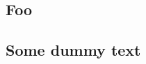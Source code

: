 \documentclass{report}
\begin{document}
\begin{titlepage}


\chapter*{Foo}
\lipsum[1]

\end{titlepage}


\section*{Some dummy text}
\lipsum[2-18]
\end{document}
